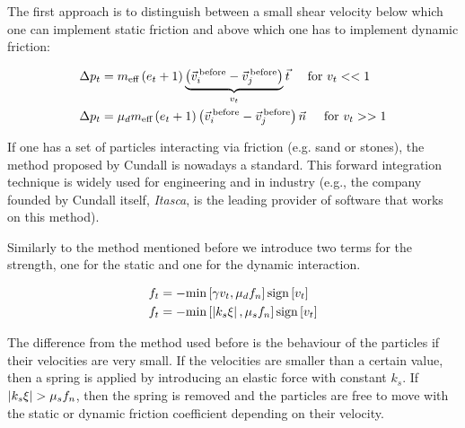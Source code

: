 The first approach \citep{luding} is to distinguish between a small shear velocity below which one can implement static friction and above which one has to implement dynamic friction:

\begin{align*}
\Delta p_t &= m_{\text{eff}} \left(e_t+1\right)\underbrace{\left(\vec{v}_i^{\,\text{before}}-\vec{v}_j^{\,\text{before}}\right)}_{v_t}\vec{t} \hspace{0.5cm} \text{for }v_t << 1 \\
\Delta p_t &= \mu_d m_{\text{eff}} \left(e_t+1\right)\left(\vec{v}_i^{\,\text{before}}-\vec{v}_j^{\,\text{before}}\right)\vec{n} \hspace{0.5cm} \text{for }v_t >> 1 \\
\end{align*}


If one has a set of particles interacting via friction (e.g. sand or stones), the method proposed by Cundall  \citep{cundall} is nowadays a standard. This forward integration technique is widely used for engineering and in industry (e.g., the company founded by Cundall itself, \emph{Itasca}, is the leading provider of software that works on this method).


Similarly to the method mentioned before we introduce two terms for the strength, one for the static and one for the dynamic interaction. 

\begin{align}
f_t &= - \text{min}\left[\gamma v_t, \mu_d f_n\right] \text{sign} \left[v_t\right] \\
f_t &= - \text{min}\left[\left|k_s\xi\right|, \mu_s f_n\right] \text{sign} \left[v_t\right]
\end{align}

The difference from the method used before is the behaviour of the particles if their velocities are very small. If the velocities are smaller than a certain value, then a spring is applied by introducing an elastic force with constant $k_s$. If $\abs{k_s\xi}> \mu_sf_n$, then the spring is removed and the particles are free to move with the static or dynamic friction coefficient depending on their velocity.  






